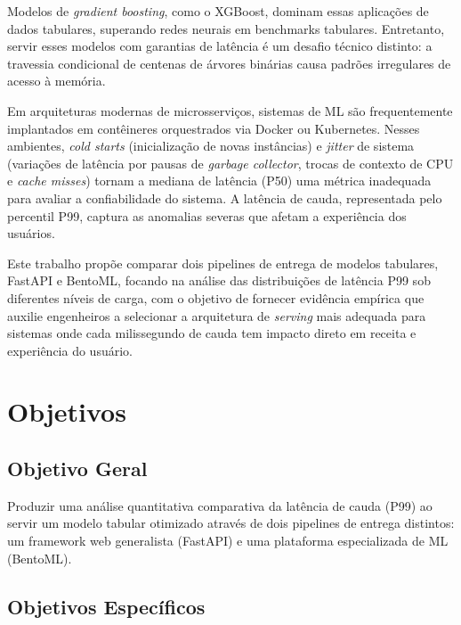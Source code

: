 \documentclass[12pt,a4paper]{article}
\renewcommand{\cite}{\supercite}
\begin{document}
Modelos de \textit{gradient boosting}, como o XGBoost,\cite{chen2016} dominam essas aplicações de dados tabulares, superando redes neurais em benchmarks tabulares.\cite{grinsztajn2022} Entretanto, servir esses modelos com garantias de latência é um desafio técnico distinto: a travessia condicional de centenas de árvores binárias causa padrões irregulares de acesso à memória.\cite{nakandala2020}

Em arquiteturas modernas de microsserviços, sistemas de ML são frequentemente implantados em contêineres orquestrados via Docker ou Kubernetes.\cite{zaharia2024} Nesses ambientes, \textit{cold starts} (inicialização de novas instâncias) e \textit{jitter} de sistema (variações de latência por pausas de \textit{garbage collector}, trocas de contexto de CPU e \textit{cache misses})\cite{dean2013} tornam a mediana de latência (P50) uma métrica inadequada para avaliar a confiabilidade do sistema. A latência de cauda, representada pelo percentil P99, captura as anomalias severas que afetam a experiência dos usuários.\cite{tene2015}

Este trabalho propõe comparar dois pipelines de entrega de modelos tabulares, FastAPI e BentoML, focando na análise das distribuições de latência P99 sob diferentes níveis de carga, com o objetivo de fornecer evidência empírica que auxilie engenheiros a selecionar a arquitetura de \textit{serving} mais adequada para sistemas onde cada milissegundo de cauda tem impacto direto em receita e experiência do usuário.

\newpage
\section{Objetivos}

\subsection{Objetivo Geral}

Produzir uma análise quantitativa comparativa da latência de cauda (P99) ao servir um modelo tabular otimizado através de dois pipelines de entrega distintos: um framework web generalista (FastAPI) e uma plataforma especializada de ML (BentoML).

\subsection{Objetivos Específicos}
\end{document}
